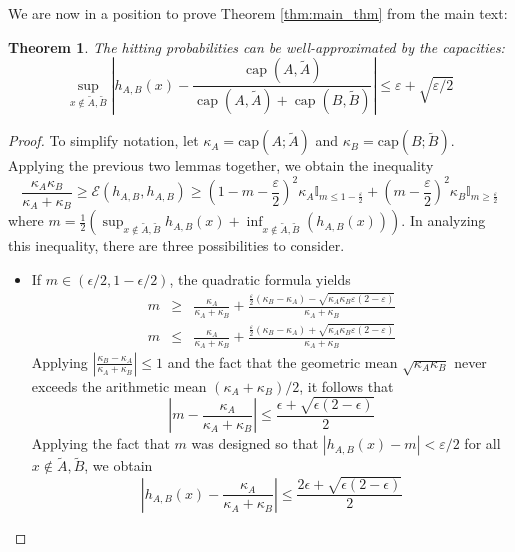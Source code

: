 \documentclass[english, aip, jcp, priprint, graphicx,floatfix]{revtex4-1}
\newtheorem{theorem}{Theorem}
\theoremstyle{plain}
\theoremstyle{definition}
\theoremstyle{plain}
\newcommand{\indicatorf}[1]{\mathbb{I}_{#1}}
\newcommand{\capac}[2]{\mathrm{cap}\left(#1;#2\right)}
\begin{document}

We are now in a position to prove Theorem \ref{thm:main_thm} from the main text:

\begingroup
\def\thetheorem{\ref{thm:main_thm}}
\begin{theorem}  The hitting probabilities can be well-approximated by the capacities:
\[ \sup_{x \notin \tilde A,\tilde B} \left| h_{A,B} (x) - \frac{\ensuremath{\operatorname{cap}} (A,
\tilde{A})}{\ensuremath{\operatorname{cap}} (A, \tilde{A})
+\ensuremath{\operatorname{cap}} (B, \tilde{B})} \right| \leqslant \varepsilon + \sqrt{\varepsilon/2} \]
\end{theorem}
\addtocounter{theorem}{-1}
\endgroup

\begin{proof}
\newcommand{\capA}{\kappa_A}
\newcommand{\capB}{\kappa_B}

To simplify notation, let $\capA=\capac{A}{\tilde A}$ and $\capB=\capac{B}{\tilde B}$.  Applying the previous two lemmas together, we obtain the inequality
\[
\frac{\capA \capB}{\capA +\capB}
\geq \mathcal{E}(h_{A,B},h_{A,B}) \geq
\left( 1 - m - \frac{\varepsilon}{2} \right)^2 \capA \indicatorf{m\leq 1-\frac{\varepsilon}{2}} + 
   \left( m- \frac{\varepsilon}{2} \right)^2 \capB \indicatorf{m\geq \frac{\varepsilon}{2}} 
\]
where $m = \frac{1}{2} (\sup_{x \notin \tilde A,\tilde B} h_{A,B} (x) + \inf_{x \notin \tilde A,\tilde B} (h_{A,B} (x)))$.  In analyzing this inequality, there are three possibilities to consider.  
\begin{itemize}
    \item If $m \in (\epsilon/2,1-\epsilon/2)$, the quadratic formula yields
    \begin{eqnarray*}
    m & \geqslant & \frac{\capA}{\capA + \capB} + \frac{
    \frac{\varepsilon}{2}(\capB - \capA) - 
    \sqrt{\capA \capB \varepsilon( 2 - \varepsilon)}}{\capA+\capB}\\
    m & \leqslant & \frac{\capA}{\capA + \capB} + \frac{
    \frac{\varepsilon}{2}(\capB - \capA) +
    \sqrt{\capA \capB \varepsilon( 2 - \varepsilon)}}{\capA+\capB}
    \end{eqnarray*}
    Applying $\left|\frac{\capB - \capA}{\capA + \capB}\right| \leq 1$ and the fact that the geometric mean $\sqrt{\capA \capB}$ never exceeds the arithmetic mean $(\capA+\capB) / 2$, it follows that
    \[
    \left|m -  \frac{\capA}{\capA + \capB}\right| \leq \frac{\epsilon +\sqrt{\epsilon (2-\epsilon)}}{2}
    \]
    Applying the fact that $m$ was designed so that $|h_{A,B}(x) - m| <\varepsilon/2$ for all $x \notin \tilde A,\tilde B$, we obtain
    \[
    \left|h_{A,B}(x) -  \frac{\capA}{\capA + \capB}\right| \leq \frac{2\epsilon +\sqrt{\epsilon (2-\epsilon)}}{2}
    \]


\end{itemize}
\end{proof}
\end{document}
